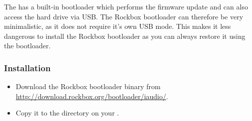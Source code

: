The \playername{} has a built-in bootloader which performs the
firmware update and can also access the hard drive via USB.  The
Rockbox bootloader can therefore be very minimalistic, as it does not require
 it's own USB mode.  This makes it less dangerous to install the Rockbox bootloader
 as you can always restore it using the \playerman{} bootloader.


\subsubsection{Installation}
\begin{itemize}
\item Download the Rockbox bootloader binary from 
\url{http://download.rockbox.org/bootloader/iaudio/}.
\item Copy it to the  directory on your \dap{}.
\end{itemize}
